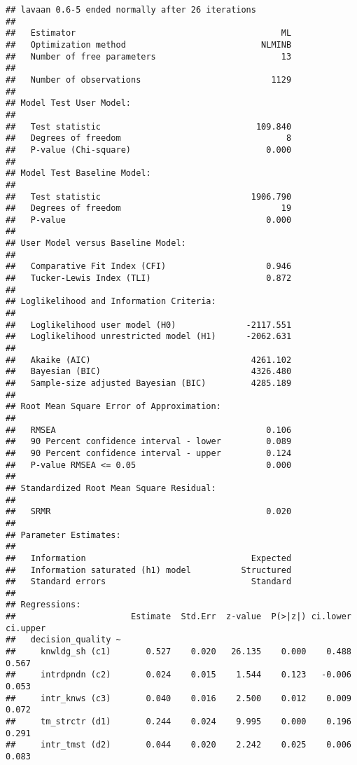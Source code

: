\documentclass[]{article}
\begin{document}
\begin{verbatim}
## lavaan 0.6-5 ended normally after 26 iterations
## 
##   Estimator                                         ML
##   Optimization method                           NLMINB
##   Number of free parameters                         13
##                                                       
##   Number of observations                          1129
##                                                       
## Model Test User Model:
##                                                       
##   Test statistic                               109.840
##   Degrees of freedom                                 8
##   P-value (Chi-square)                           0.000
## 
## Model Test Baseline Model:
## 
##   Test statistic                              1906.790
##   Degrees of freedom                                19
##   P-value                                        0.000
## 
## User Model versus Baseline Model:
## 
##   Comparative Fit Index (CFI)                    0.946
##   Tucker-Lewis Index (TLI)                       0.872
## 
## Loglikelihood and Information Criteria:
## 
##   Loglikelihood user model (H0)              -2117.551
##   Loglikelihood unrestricted model (H1)      -2062.631
##                                                       
##   Akaike (AIC)                                4261.102
##   Bayesian (BIC)                              4326.480
##   Sample-size adjusted Bayesian (BIC)         4285.189
## 
## Root Mean Square Error of Approximation:
## 
##   RMSEA                                          0.106
##   90 Percent confidence interval - lower         0.089
##   90 Percent confidence interval - upper         0.124
##   P-value RMSEA <= 0.05                          0.000
## 
## Standardized Root Mean Square Residual:
## 
##   SRMR                                           0.020
## 
## Parameter Estimates:
## 
##   Information                                 Expected
##   Information saturated (h1) model          Structured
##   Standard errors                             Standard
## 
## Regressions:
##                       Estimate  Std.Err  z-value  P(>|z|) ci.lower ci.upper
##   decision_quality ~                                                       
##     knwldg_sh (c1)       0.527    0.020   26.135    0.000    0.488    0.567
##     intrdpndn (c2)       0.024    0.015    1.544    0.123   -0.006    0.053
##     intr_knws (c3)       0.040    0.016    2.500    0.012    0.009    0.072
##     tm_strctr (d1)       0.244    0.024    9.995    0.000    0.196    0.291
##     intr_tmst (d2)       0.044    0.020    2.242    0.025    0.006    0.083

\end{verbatim}
\end{document}
